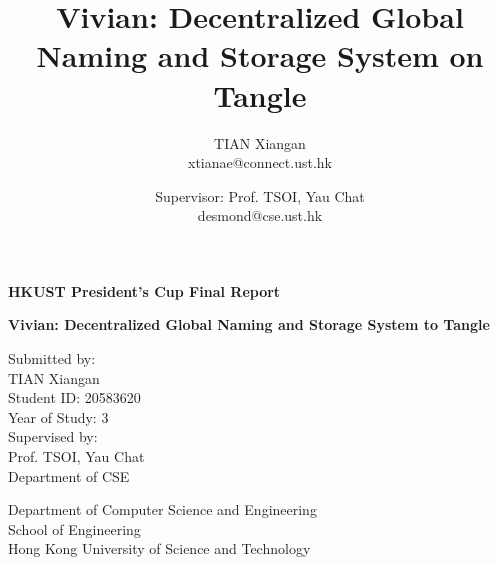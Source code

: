 \documentclass[conference, 10pt]{IEEEtran}
\begin{document}
\begin{titlepage}
    \begin{center}
        \vspace*{2cm}

        \LARGE
        \textbf{HKUST President's Cup Final Report}
        \vspace{0.5cm}

        \Huge
        \textbf{Vivian: Decentralized Global Naming and Storage System to Tangle}

        \vfill

        \Large
        Submitted by: \\
        \vspace{0.2cm}
        TIAN Xiangan \\
        \vspace{0.2cm}
        Student ID: 20583620 \\
        \vspace{0.2cm}
        Year of Study: 3 \\
        \vspace{1.5cm}
        Supervised by: \\
        
        \vspace{0.2cm}
        Prof. TSOI, Yau Chat \\
        \vspace{0.2cm}
        Department of CSE


        \vfill

        \vspace{0.8cm}

        \large
        Department of Computer Science and Engineering \\
        \vspace{0.15cm}
        School of Engineering \\
        \vspace{0.15cm}
        Hong Kong University of Science and Technology

    \end{center}
\end{titlepage}

\title{Vivian: Decentralized Global Naming and Storage System on Tangle}

\author{
    TIAN Xiangan \\
    xtianae@connect.ust.hk
    \and
    Supervisor: Prof. TSOI, Yau Chat \\
    desmond@cse.ust.hk
}

\maketitle
\end{document}
